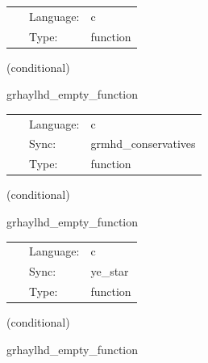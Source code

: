 \documentclass{article}
\begin{document}
 \begin{tabular*}{160mm}{cll} 
~ & Language:  & c \\ 
~ & Type:  & function \\ 
\end{tabular*} 


\vspace{5mm}

   (conditional) 

\hspace{5mm} grhaylhd\_empty\_function 

\hspace{5mm}{\it sync required conservatives } 


\hspace{5mm}

 \begin{tabular*}{160mm}{cll} 
~ & Language:  & c \\ 
~ & Sync:  & grmhd\_conservatives \\ 
~ & Type:  & function \\ 
\end{tabular*} 


\vspace{5mm}

   (conditional) 

\hspace{5mm} grhaylhd\_empty\_function 

\hspace{5mm}{\it sync allocated electron-fraction conservatives } 


\hspace{5mm}

 \begin{tabular*}{160mm}{cll} 
~ & Language:  & c \\ 
~ & Sync:  & ye\_star \\ 
~ & Type:  & function \\ 
\end{tabular*} 


\vspace{5mm}

   (conditional) 

\hspace{5mm} grhaylhd\_empty\_function 

\hspace{5mm}{\it sync allocated entropy conservatives } 
\end{document}
